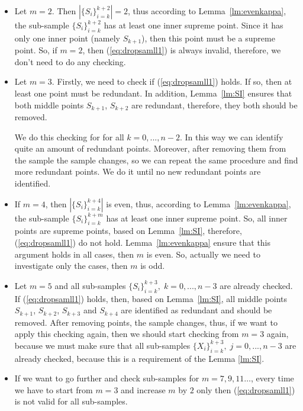 \documentclass[12pt, a4paper]{article}
\numberwithin{equation}{section}
\begin{document}
\begin{itemize}

\item 
Let $m=2$. Then $|\{S_{i}\}_{i=k}^{k+2}|=2$, 
thus according to
Lemma~\ref{lm:evenkappa}, the sub-sample
$\{S_{i}\}_{i=k}^{k+2}$ has at least one
inner supreme point. 
Since it has only one inner point (namely $S_{k+1}$), 
then this point must be a supreme point. 
So, if $m=2$, then  (\ref{eq:dropsamll1}) is always
invalid, therefore, we don't need to do any checking.

\item 
Let $m=3$. Firstly, we need to check if (\ref{eq:dropsamll1}) holds.
If so,
then at least one 
point must be redundant.
In addition, Lemma~\ref{lm:SI} ensures that 
both middle points $S_{k+1}$, $S_{k+2}$ 
are redundant, therefore, they both should be removed. 

We do this checking for  for all
$k=0,...,n-2$. In this way
we can identify quite an amount of redundant
points. Moreover, 
after removing them from the sample the 
sample changes, so we can repeat the same procedure
and find more redundant points. We do it until
no new redundant points are 
identified.

\item 
If $m=4$, then $|\{S_{i}\}_{i=k}^{k+4}|$ is even, 
thus, according to Lemma~\ref{lm:evenkappa}, 
the sub-sample
$\{S_{i}\}_{i=k}^{k+m}$ has at least one
inner supreme point. 
So, all inner points are supreme points, 
based on Lemma~\ref{lm:SI}, therefore, 
(\ref{eq:dropsamll1}) do not hold.
Lemma~\ref{lm:evenkappa} ensure
that this argument holds in all cases, then $m$ is even.
So, actually we need to investigate only the cases, then 
$m$ is odd. 

\item 
Let 
$m=5$ and all sub-samples
 $\{S_{i}\}_{i=k}^{k+3},\;k=0,...,n-3$ are already 
 checked.
If (\ref{eq:dropsamll1}) holds, then, based on
Lemma~\ref{lm:SI}, all middle points
$S_{k+1}$, $S_{k+2}$, $S_{k+3}$  and $S_{k+4}$ are  
identified as redundant and should be removed.
After removing points, the sample changes, thus,
if we want to apply this checking again,
then we should start checking from $m=3$ again, because
we must make sure that all sub-samples
$\{X_{i}\}_{i=k}^{k+3},\;j=0,...,n-3$ are already 
checked, because this is a requirement of the Lemma \ref{lm:SI}.

\item If we want to go further and check
sub-samples for $m=7,9,11\dots$, every time we have to
start from $m=3$ and increase $m$ by $2$ only then
(\ref{eq:dropsamll1}) is not valid for
all sub-samples.

\end{itemize}
\end{document}
